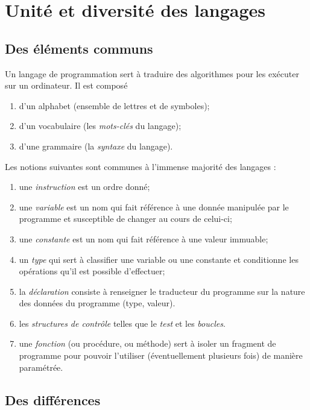 \chapter{Unité et diversité des langages}

\section{Des éléments communs}
Un langage de programmation sert à traduire des algorithmes pour les exécuter sur un ordinateur. Il est composé 
\begin{enumerate}[--]
    \item   d'un alphabet (ensemble de lettres et de symboles);
    \item   d'un vocabulaire (les \textit{mots-clés} du langage);
    \item   d'une grammaire (la \textit{syntaxe} du langage).
\end{enumerate}

Les notions suivantes sont communes à l'immense majorité des langages :

\begin{enumerate}[--]
    \item   une \textit{instruction} est un ordre donné;
    \item   une \textit{variable} est un nom qui fait référence à une donnée manipulée par le programme et susceptible de changer au cours de celui-ci;
    \item   une \textit{constante} est un nom qui fait référence à une valeur immuable;
    \item   un \textit{type} qui sert à classifier une variable ou une constante et conditionne les opérations qu'il est possible d'effectuer;
    \item   la \textit{déclaration} consiste à renseigner le traducteur du programme sur la nature des données du programme (type, valeur).
    \item   les \textit{structures de contrôle} telles que le \textit{test} et les \textit{boucles}.
    \item   une \textit{fonction} (ou procédure, ou méthode) sert à isoler un fragment de programme pour pouvoir l'utiliser (éventuellement plusieurs fois) de manière paramétrée.
\end{enumerate}

\section{Des différences}

